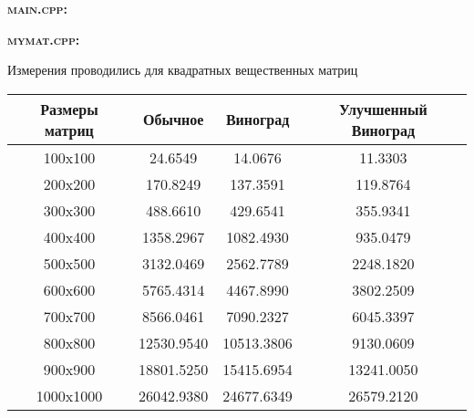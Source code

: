 	\textbf{\textsc{main.cpp:}}
	
	
	\vspace{\baselineskip}
	
	\textbf{\textsc{mymat.cpp:}}
		
	



	\newpage
	
	\flushleft
	Измерения проводились для квадратных вещественных матриц
	
	\begin{center} %
		\begin{tabular}{|c|c|c|c|}
			\hline
			Размеры матриц & Обычное & Виноград & Улучшенный Виноград\\
			
			\hline 
			100x100 & 
			24.6549 & 
			14.0676 &
			11.3303\\
			
			
			\hline 
			200x200 & 
			170.8249 &
			137.3591 &
			119.8764 \\
			
			\hline 
			300x300 & 
			488.6610 &
			429.6541 &
			355.9341 \\
			
			
			\hline 
			400x400 & 
			1358.2967 &
			1082.4930 &
			935.0479 \\
			
			
			\hline 
			500x500 & 
			3132.0469 &
			2562.7789 &
			2248.1820 \\
			
			\hline 
			600x600 & 
			5765.4314 &
			4467.8990 &
			3802.2509 \\
			
			\hline 
			700x700 & 
			8566.0461 &
			7090.2327 &
			6045.3397 \\
			
			\hline 
			800x800 & 
			12530.9540 &
			10513.3806 &
			9130.0609 \\
			
			\hline 
			900x900 & 
			18801.5250 &
			15415.6954 &
			13241.0050 \\
			
			\hline 
			1000x1000 & 
			26042.9380 &
			24677.6349 &
			26579.2120 \\
			
			\hline			
		\end{tabular}
	\end{center}
	
